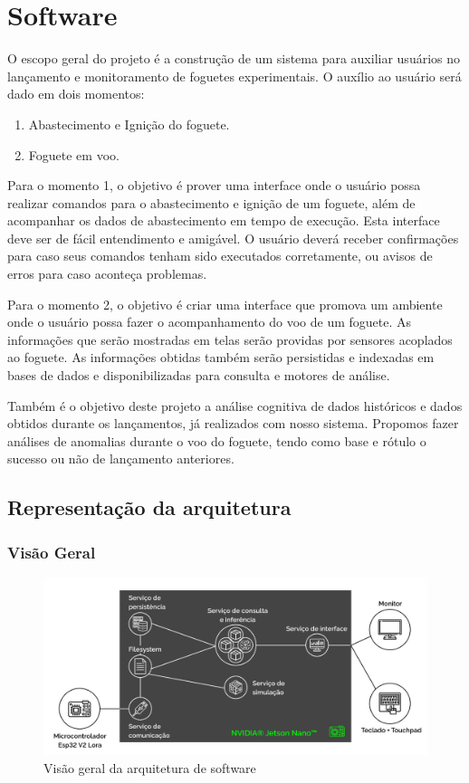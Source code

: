 \section{Software}

O escopo geral do projeto é a construção de um sistema para auxiliar usuários no lançamento e monitoramento de foguetes experimentais. O auxílio ao usuário será dado em dois momentos:  

\begin{enumerate}
    \item Abastecimento e Ignição do foguete. 
    \item Foguete em voo.
\end{enumerate}

Para o momento 1, o objetivo é prover uma interface onde o usuário possa realizar comandos para o abastecimento e ignição de um foguete, além de acompanhar os dados de abastecimento em tempo de execução. Esta interface deve ser de fácil entendimento e amigável. O usuário deverá receber confirmações para caso seus comandos tenham sido executados corretamente, ou avisos de erros para caso aconteça problemas.  

Para o momento 2, o objetivo é criar uma interface que promova um ambiente onde o usuário possa fazer o acompanhamento do voo de um foguete. As informações que serão mostradas em telas serão providas por sensores acoplados ao foguete. As informações obtidas também serão persistidas e indexadas em bases de dados e disponibilizadas para consulta e motores de análise. 

Também é o objetivo deste projeto a análise cognitiva de dados históricos e dados obtidos durante os lançamentos, já realizados com nosso sistema. Propomos fazer análises de anomalias durante o voo do foguete, tendo como base e rótulo o sucesso ou não de lançamento anteriores.

\subsection{Representação da arquitetura}

\subsubsection{Visão Geral}
\begin{figure}[H]
\centering
\includegraphics[width=1\textwidth]{figuras/arquitetura_visao_geral}
\caption{Visão geral da arquitetura de software}
\end{figure}

